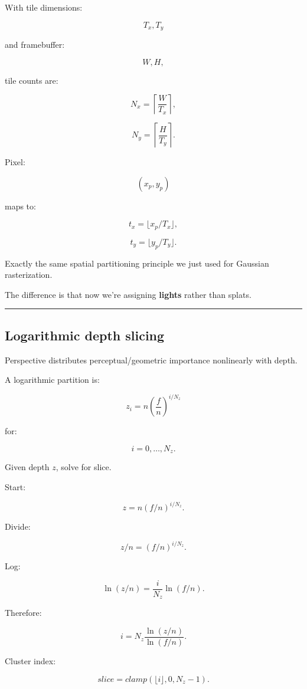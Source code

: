 With tile dimensions:

\[
T_x,T_y
\]

and framebuffer:

\[
W,H,
\]

tile counts are:

\[
N_x=
\left\lceil\frac{W}{T_x}\right\rceil,
\]

\[
N_y=
\left\lceil\frac{H}{T_y}\right\rceil.
\]

Pixel:

\[
(x_p,y_p)
\]

maps to:

\[
t_x=
\lfloor x_p/T_x\rfloor,
\]

\[
t_y=
\lfloor y_p/T_y\rfloor.
\]

Exactly the same spatial partitioning principle we just used for Gaussian rasterization.

The difference is that now we're assigning \textbf{lights} rather than splats.

\begin{center}\rule{0.5\linewidth}{0.5pt}\end{center}

\subsection{Logarithmic depth slicing}\label{04-visual-computing-ii-ch040-logarithmic-depth-slicing}

Perspective distributes perceptual/geometric importance nonlinearly with depth.

A logarithmic partition is:

\[
\boxed{
z_i
=
n
\left(
\frac fn
\right)^{i/N_z}
}
\]

for:

\[
i=0,\dots,N_z.
\]

Given depth \(z\), solve for slice.

Start:

\[
z=
n(f/n)^{i/N_z}.
\]

Divide:

\[
z/n=
(f/n)^{i/N_z}.
\]

Log:

\[
\ln(z/n)
=
\frac i{N_z}
\ln(f/n).
\]

Therefore:

\[
\boxed{
i
=
N_z
\frac{
\ln(z/n)
}{
\ln(f/n)
}.
}
\]

Cluster index:

\[
slice=
clamp(
\lfloor i\rfloor,
0,
N_z-1
).
\]


